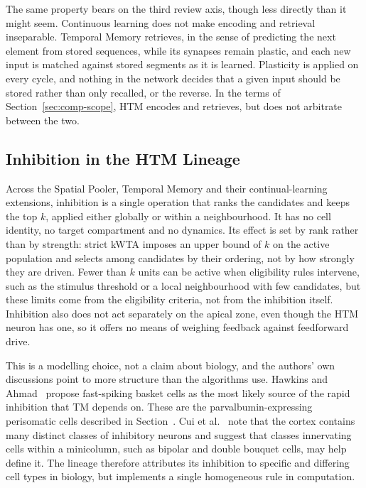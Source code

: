 The same property bears on the third review axis, though less directly than it
might seem. Continuous learning does not make encoding and retrieval
inseparable. Temporal Memory retrieves, in the sense of predicting the next
element from stored sequences, while its synapses remain plastic, and each new
input is matched against stored segments as it is learned. Plasticity is
applied on every cycle, and nothing in the network decides that a given input
should be stored rather than only recalled, or the reverse. In the terms of
Section~\ref{sec:comp-scope}, HTM encodes and retrieves, but does not
arbitrate between the two.

\subsection{Inhibition in the HTM Lineage}
\label{subsec:comp-htm-inhibition}

Across the Spatial Pooler, Temporal Memory and their continual-learning
extensions, inhibition is a single operation that ranks the candidates and
keeps the top $k$, applied either globally or within a neighbourhood. It
has no cell identity, no target compartment and no dynamics. Its effect is set
by rank rather than by strength: strict kWTA imposes an upper bound of
$k$ on the active population and selects among candidates by their
ordering, not by how strongly they are driven. Fewer than $k$ units can
be active when eligibility rules intervene, such as the stimulus threshold or
a local neighbourhood with few candidates, but these limits come from the
eligibility criteria, not from the inhibition itself. Inhibition also does not
act separately on the apical zone, even though the HTM neuron has one, so it
offers no means of weighing feedback against feedforward drive.

This is a modelling choice, not a claim about biology, and the authors' own
discussions point to more structure than the algorithms use. Hawkins and
Ahmad~\cite{hawkins2016neurons} propose fast-spiking basket cells as the most
likely source of the rapid inhibition that TM depends on. These are the
parvalbumin-expressing perisomatic cells described in Section~. Cui et
al.~\cite{cui2017sp} note that the cortex contains many distinct classes of
inhibitory neurons and suggest that classes innervating cells within a
minicolumn, such as bipolar and double bouquet cells, may help define it. The
lineage therefore attributes its inhibition to specific and differing cell
types in biology, but implements a single homogeneous rule in computation.

